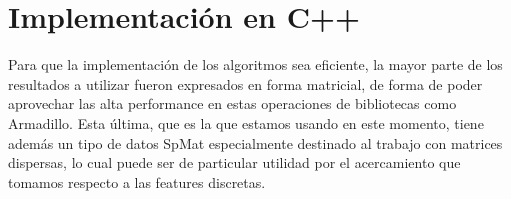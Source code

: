\section{Implementación en C++}
Para que la implementación de los algoritmos sea eficiente, la mayor parte de los resultados a utilizar fueron expresados en forma matricial, de forma de poder aprovechar las alta performance en estas operaciones de bibliotecas como Armadillo. Esta última, que es la que estamos usando en este momento, tiene además un tipo de datos SpMat especialmente destinado al trabajo con matrices dispersas, lo cual puede ser de particular utilidad por el acercamiento que tomamos respecto a las features discretas.